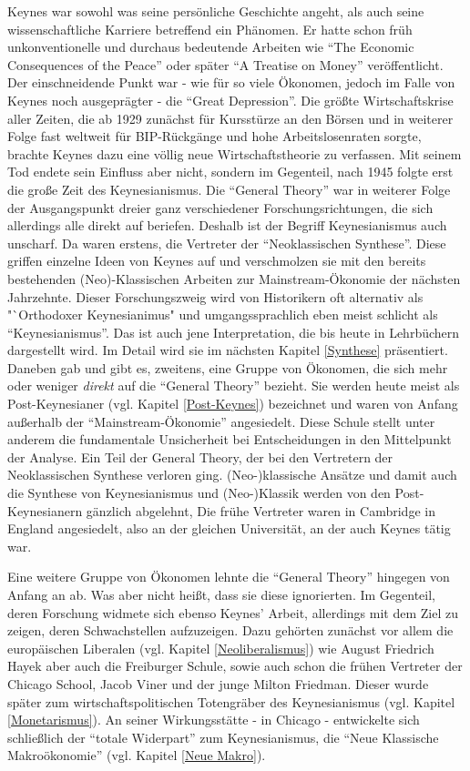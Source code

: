 Keynes war sowohl was seine persönliche Geschichte angeht, als auch seine wissenschaftliche Karriere betreffend ein Phänomen. Er hatte schon früh unkonventionelle und durchaus bedeutende Arbeiten wie \textcite{Keynes1919} "`The Economic Consequences of the Peace"' oder später  \textcite{Keynes1930} "`A Treatise on Money"' veröffentlicht. Der einschneidende Punkt war - wie für so viele Ökonomen, jedoch im Falle von Keynes noch ausgeprägter - die "`Great Depression"'. Die größte Wirtschaftskrise aller Zeiten, die ab 1929 zunächst für Kursstürze an den Börsen und in weiterer Folge fast weltweit für BIP-Rückgänge und hohe Arbeitslosenraten sorgte, brachte Keynes dazu eine völlig neue Wirtschaftstheorie zu verfassen. Mit seinem Tod endete sein Einfluss aber nicht, sondern im Gegenteil, nach 1945 folgte erst die große Zeit des Keynesianismus. Die "`General Theory"' war in weiterer Folge der Ausgangspunkt dreier ganz verschiedener Forschungsrichtungen, die sich allerdings alle direkt auf \textcite{Keynes1936} beriefen. Deshalb ist der Begriff Keynesianismus auch unscharf. Da waren erstens, die Vertreter der "`Neoklassischen Synthese"'. Diese griffen einzelne Ideen von Keynes auf und verschmolzen sie mit den bereits bestehenden (Neo)-Klassischen Arbeiten zur Mainstream-Ökonomie der nächsten Jahrzehnte. Dieser Forschungszweig wird von Historikern oft alternativ als "`Orthodoxer Keynesianimus" und umgangssprachlich eben meist schlicht als "`Keynesianismus"'. Das ist auch jene Interpretation, die bis heute in Lehrbüchern dargestellt wird. Im Detail wird sie im nächsten Kapitel \ref{Synthese} präsentiert. Daneben gab und gibt es, zweitens, eine Gruppe von Ökonomen, die sich mehr oder weniger \textit{direkt} auf die "`General Theory"' bezieht. Sie werden heute meist als Post-Keynesianer (vgl. Kapitel \ref{Post-Keynes}) bezeichnet und waren von Anfang außerhalb der "`Mainstream-Ökonomie"' angesiedelt. Diese Schule stellt unter anderem die fundamentale Unsicherheit bei Entscheidungen in den Mittelpunkt der Analyse. Ein Teil der General Theory, der bei den Vertretern der Neoklassischen Synthese verloren ging.  (Neo-)klassische Ansätze und damit auch die Synthese von Keynesianismus und (Neo-)Klassik werden von den Post-Keynesianern gänzlich abgelehnt, Die frühe Vertreter waren in Cambridge in England angesiedelt, also an der gleichen Universität, an der auch Keynes tätig war. 

Eine weitere Gruppe von Ökonomen lehnte die "`General Theory"' hingegen von Anfang an ab. Was aber nicht heißt, dass sie diese ignorierten. Im Gegenteil, deren Forschung widmete sich ebenso Keynes' Arbeit, allerdings mit dem Ziel zu zeigen, deren Schwachstellen aufzuzeigen. Dazu gehörten zunächst vor allem die europäischen Liberalen (vgl. Kapitel \ref{Neoliberalismus}) wie August Friedrich Hayek aber auch die Freiburger Schule, sowie auch schon die frühen Vertreter der Chicago School, Jacob Viner und der junge Milton Friedman. Dieser wurde später zum wirtschaftspolitischen Totengräber des Keynesianismus (vgl. Kapitel \ref{Monetarismus}). An seiner Wirkungsstätte - in Chicago - entwickelte sich schließlich der "`totale Widerpart"' zum Keynesianismus, die "`Neue Klassische Makroökonomie"' (vgl. Kapitel \ref{Neue Makro}).


